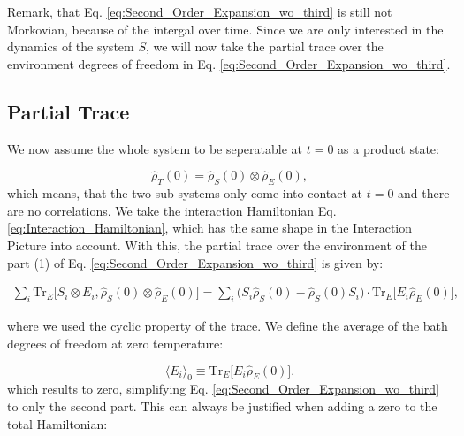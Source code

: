 Remark, that Eq. \eqref{eq:Second_Order_Expansion_wo_third} is still not Morkovian, because of the intergal over time.
Since we are only interested in the dynamics of the system $ S $, we will now take the partial trace over the environment degrees of freedom in Eq. \eqref{eq:Second_Order_Expansion_wo_third}.


\subsection{Partial Trace}
\label{subsec:Partial_Trace}

We now assume the whole system to be seperatable at $ t = 0 $ as a product state:

\begin{equation}
    \hat{\rho}_T(0) = \hat{\rho}_S(0) \otimes \hat{\rho}_E(0),
    \label{eq:Initial_Product_State}
\end{equation}
which means, that the two sub-systems only come into contact at $ t = 0 $ and there are no correlations.
We take the interaction Hamiltonian Eq. \eqref{eq:Interaction_Hamiltonian}, which has the same shape in the Interaction Picture into account.
With this, the partial trace over the environment of the part (1) of Eq. \eqref{eq:Second_Order_Expansion_wo_third} is given by:

\begin{align}
    \sum_i \mathrm{Tr}_E\big[ S_i \otimes E_i , \hat{\rho}_S(0) \otimes \hat{\rho}_E(0)\big]
    = \sum_i \big(S_i \hat{\rho}_S(0) - \hat{\rho}_S(0) S_i\big) \cdot \mathrm{Tr}_E \big[E_i \hat{\rho}_E(0)\big],
    \label{eq:Trace_Relation_first_part}
\end{align}

where we used the cyclic property of the trace.
We define the average of the bath degrees of freedom at zero temperature:

\begin{equation}
    \langle E_i \rangle_0 \equiv \mathrm{Tr}_E \big[E_i \hat{\rho}_E(0)\big].
    \label{eq:Environment_Expectation_Value}
\end{equation}
which results to zero, simplifying Eq. \eqref{eq:Second_Order_Expansion_wo_third} to only the second part.
This can always be justified when adding a zero to the total Hamiltonian:

